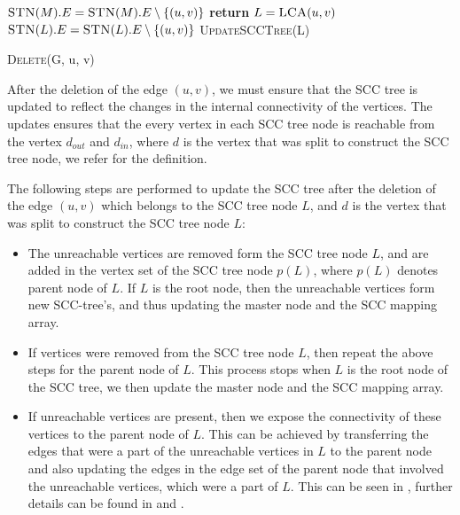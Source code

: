 \begin{algorithm}[H]
    \SetAlgoLined
     {
        $\text{\textsc{STN}}(M).E = \text{\textsc{STN}}(M).E \setminus \{(u, v)\}$\;
        \textbf{return}\;
    }
    $L = \text{\textsc{LCA}}(u, v)$\;
    $\text{\textsc{STN}}(L).E = \text{\textsc{STN}}(L).E \setminus \{(u, v)\}$\;
    \textsc{UpdateSCCTree}(L)\;
    \caption{\textsc{Delete}(G, u, v)}
\end{algorithm}

After the deletion of the edge $(u, v)$, we must ensure that the SCC tree is updated to reflect the changes in the internal connectivity of the vertices.
The updates ensures that the every vertex in each SCC tree node is reachable from the vertex $d_{out}$ and $d_{in}$, where $d$ is the vertex that was split to construct the SCC tree node,
we refer \secref{\ref{Subsubsec: Unreachable}} for the definition.

The following steps are performed to update the SCC tree after the deletion of the edge $(u, v)$ which belongs to the SCC tree node $L$, and $d$ is the vertex that was split to construct the SCC tree node $L$:
\begin{itemize}
    \item The unreachable vertices are removed form the SCC tree node $L$, and are added in the vertex set of the SCC tree node $p(L)$, where $p(L)$ denotes parent node of $L$.
If $L$ is the root node, then the unreachable vertices form new SCC-tree's, and thus updating the master node and the SCC mapping array.
    \item If vertices were removed from the SCC tree node $L$, then repeat the above steps for the parent node of $L$. This process stops when $L$ is the root node of the SCC tree, we then update the master node and the SCC mapping array.
    \item If unreachable vertices are present, then we expose the connectivity of these vertices to the parent node of $L$. This can be achieved by transferring
the edges that were a part of the unreachable vertices in $L$ to the parent node and also updating the edges in the edge set of the parent node that involved the unreachable vertices, which were a part of $L$.
This can be seen in \figureref{\ref{fig:tree_node_r_graph_exposed1}}, further details can be found in \secref{\ref{Subsubsec: Deleting Edge from the Root Node}} and \secref{\ref{Subsubsec: Deleting Edge from an Internal Node}}.
\end{itemize}

